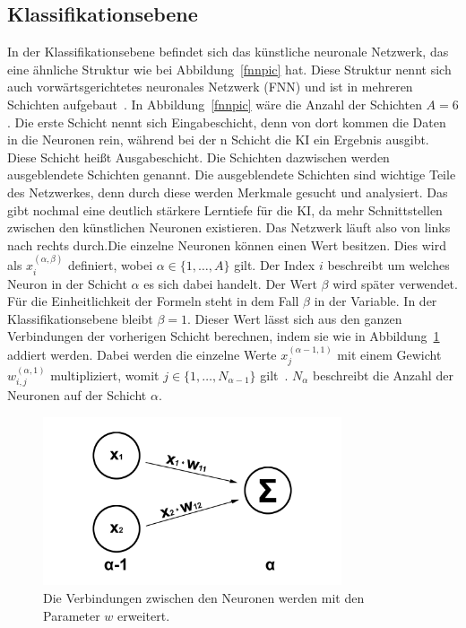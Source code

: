 \documentclass[11pt]{article}
\begin{document}
\subsection{Klassifikationsebene}\label{fcnn}
In der Klassifikationsebene befindet sich das künstliche neuronale Netzwerk, das eine ähnliche Struktur wie bei Abbildung~\ref{fnnpic} hat.
Diese Struktur nennt sich auch vorwärtsgerichtetes neuronales Netzwerk (FNN) und ist in mehreren Schichten aufgebaut~\cite{5}. In Abbildung~\ref{fnnpic} wäre die Anzahl
der Schichten $A = 6$. Die erste Schicht nennt sich Eingabeschicht, denn von dort kommen die Daten in die Neuronen rein, während bei
der n Schicht die KI ein Ergebnis ausgibt. Diese Schicht heißt Ausgabeschicht. Die Schichten dazwischen werden ausgeblendete Schichten genannt.
Die ausgeblendete Schichten sind wichtige Teile des Netzwerkes, denn durch diese werden Merkmale gesucht und analysiert.
Das gibt nochmal eine deutlich stärkere Lerntiefe für die KI, da mehr Schnittstellen zwischen den künstlichen Neuronen existieren.
Das Netzwerk läuft also von links nach rechts durch.\@ Die einzelne Neuronen können einen Wert besitzen. Dies wird als $ x_{i}^{(\alpha,\beta)} $ definiert,
wobei $ \alpha \in \{1,\ldots,A\} $ gilt. Der Index $i$ beschreibt um welches Neuron in der Schicht $\alpha$ es sich dabei handelt. Der Wert $\beta$ wird später
verwendet. Für die Einheitlichkeit der Formeln steht in dem Fall $\beta$ in der Variable. In der Klassifikationsebene bleibt $\beta = 1$. Dieser Wert
lässt sich aus den ganzen Verbindungen der vorherigen Schicht berechnen, indem sie wie in Abbildung~\ref{connection} addiert werden. Dabei werden
die einzelne Werte $ x_{j}^{(\alpha-1,1)} $ mit einem Gewicht $ w_{i,j}^{(\alpha,1)} $ multipliziert, womit $ j \in \{1,\ldots,N_{\alpha-1}\} $ gilt~\cite{5}.
$ N_{\alpha} $ beschreibt die Anzahl der Neuronen auf der Schicht $\alpha$.
\begin{figure}[h]
    \centering
    \includegraphics[width=250pt, keepaspectratio]{images/verbindung}
    \caption[Verbindungen zwischen den Neuronen]{Die Verbindungen zwischen den Neuronen werden mit den Parameter $w$ erweitert.}\label{connection}
\end{figure}
\end{document}
